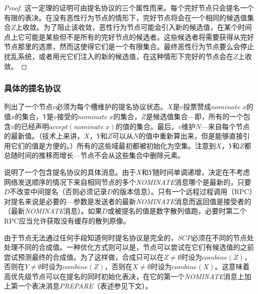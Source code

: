 \begin{proof}
	这一定理的证明可由提名协议的三个属性而来。每个完好节点只会提名一个有限的表决。在没有恶性行为节点的情形下，完好节点将会在一个相同的候选值集合$Z$上收敛。为了阻止该收敛，恶性行为节点可能会引入新的候选值，在某个时间点上它可能是某些但不是所有的完好节点的候选者。这些候选者将需要获得从完好节点那里的选票，然而这使得它们是一个有限集合。最终恶性行为节点要么会停止扰乱系统，或者用光它们注入的新的候选值，在这种情形下完好的节点会在$Z$上收敛。
\end{proof}

\subsubsection{具体的提名协议}

列出了一个节点$v$必须为每个槽维护的提名协议状态。$X$是$v$投票赞成$nominate\;x$的值$x$的集合，$Y$是$v$接受的$nominate\;x$的集合，$Z$是候选值集合---即，所有的一个包含$v$的{\quorum}已经声明$accept(nominate\;x)$的值的集合。最后，$v$维护$N$---来自每个节点的最新值。（技术上来讲，$X$，$Y$和$Z$可以从$N$的值中重新算出来，但是能够直接引用它们的值是方便的。）所有的这些域最初都被初始化为空集。注意到$X$，$Y$和$Z$都总随时间的推移而增长---节点不会从这些集合中删除元素。

说明了一个包含提名协议的具体消息。由于$X$和$Y$随时间单调递增，决定在不考虑网络发送顺序的情况下来自相同节点的多个\textsl{NOMINATE}消息哪个是最新的，只要$D$不改变中间提名（否则必须记录$D$的版本信息）。只有一个远程过程调用（RPC）对提名来说是必要的---参数是发送者的最新\textsl{NOMINATE}消息而返回值是接受者的（最新\textsl{NOMINATE}消息）。如果$D$或被提名的值是数字散列值跑，必要时第二个RPC应当允许获取没有缓存的散列原像。

由于节点无法通过任何手段知道何时提名协议是完全的，$SCP$必须在不同的节点处处理不同的合成值。一种优化方式则可以是，节点可以尝试在它们有候选值的之前尝试预测最终的合成值。为了这样做，合成只可以在$Z\neq \emptyset$时设为$combine(Z)$，否则在$Y\neq \emptyset$时设为$combine(Z)$，否则在$X\neq \emptyset$时设为$combine(X)$。这意味着高优先级节点可以在提名的同时初始化表决，在它的第一个\textsl{NOMINATE}消息上加上第一个表决消息\textsl{PREPARE}（表述参见下文）。
